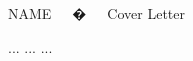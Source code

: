 \documentclass[11pt, a4paper]{awesome-cv}
\begin{document}
\makecvheader[R]
\makecvfooter
  {}
  {NAME~~~�~~~Cover Letter}
  {}

\makelettertitle

\begin{cvletter}

 ...
...
...
\end{cvletter}

\makeletterclosing
\end{document}
